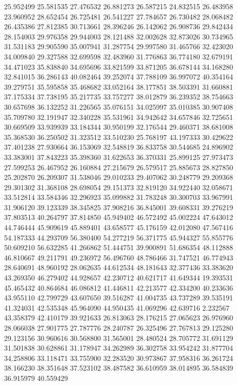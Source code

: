25.952499
25.581535
27.476532
26.881273
26.587215
24.832515
26.483958
23.960952
28.652454
26.725481
26.541227
27.784657
26.730482
28.068482
26.435386
27.812385
30.713661
28.396246
26.142062
26.908736
29.842434
28.154003
29.976358
29.944003
28.121488
32.002628
32.873026
30.734965
31.531183
29.905590
35.007941
31.287754
29.997580
31.465766
32.423020
34.009840
29.327588
32.699598
32.483960
31.776863
36.774180
32.679191
34.471023
35.838840
34.695696
33.821599
33.871205
36.678144
34.168280
32.841015
36.286143
40.082464
39.252074
37.788109
36.997072
40.354164
39.279751
35.595858
35.468682
33.052164
38.177851
38.503391
31.660881
37.175334
37.738195
35.217735
33.757277
38.012879
36.239352
38.754663
30.657698
36.132252
31.226565
35.076151
34.025997
35.010385
30.907408
35.709780
32.191947
32.340228
35.531961
34.942642
34.657846
32.725651
30.669509
33.939939
33.184344
30.950199
32.176544
29.460371
38.681008
35.368530
36.250502
31.323512
33.510230
25.768197
43.197333
30.429622
37.401238
27.930664
36.153069
32.548819
36.833758
30.544685
24.896902
33.383001
37.843223
35.398360
31.622653
36.370331
25.899125
27.973473
27.599253
26.467952
26.160884
27.215679
26.579517
25.885673
28.827850
25.202870
26.209307
31.538046
29.010233
29.407062
30.248779
29.209368
29.301302
31.368108
28.698054
29.151373
32.819120
34.922440
32.058671
33.512814
33.584346
32.296923
35.099882
31.783248
30.300703
33.967991
31.906120
39.123339
38.345825
37.908216
36.845001
39.608331
39.276219
37.803513
40.264797
37.814850
45.949402
46.572492
45.002224
47.643012
44.746444
45.909619
45.889401
43.658577
45.176159
42.012080
47.567416
54.187333
44.293709
56.380400
54.277219
56.371775
45.944327
55.855776
50.609210
56.632285
41.266862
51.444751
39.900891
51.686354
48.112888
46.810667
49.211791
49.236972
56.496760
48.786466
31.747521
46.774943
28.640691
48.960192
28.062635
44.612534
48.181643
32.377436
33.383620
43.269350
46.279402
44.928657
42.230712
40.621717
41.649344
19.393531
45.465432
40.864684
46.086812
41.446811
42.213577
42.334200
40.233636
43.955110
42.799729
43.607650
39.516287
41.004735
43.737289
39.535191
41.324031
42.535348
45.964090
44.950435
41.069296
42.639716
2.232567
43.358379
42.410179
39.921633
26.813063
28.176215
27.065623
26.976960
28.066038
27.901775
27.787776
28.240787
26.325496
27.767813
29.125280
29.123156
30.960616
30.568800
31.565001
28.480524
28.705772
31.691129
31.501838
30.628861
31.178947
34.262989
36.302758
33.954242
31.877704
34.258806
33.118471
33.755900
32.283520
30.973867
37.958316
36.261724
38.166230
38.351648
37.523102
38.487582
36.610959
38.014895
36.584839
36.915979
40.559429
